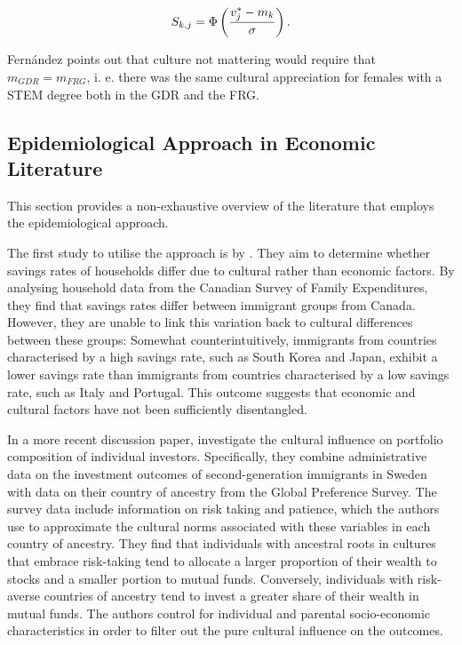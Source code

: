 \documentclass[a4paper, oneside, hyperfootnotes = false]{article}
\begin{document}
{\vspace{-8mm}

\begin{equation}
	\label{eq:sharecdfancestry}
	S_{k,j} = \Phi\left(\frac{v^{*}_{j} - m_{k}}{\sigma}\right)\textnormal{.}
\end{equation}

Fernández points out that culture not mattering would require that $m_{GDR} = m_{FRG}$, i. e. there was the same cultural appreciation for females with a STEM degree both in the GDR and the FRG.

\subsection{Epidemiological Approach in Economic Literature}
\label{epidliterature}

This section provides a non-exhaustive overview of the literature that employs the epidemiological approach.

The first study to utilise the approach is by \cite{Carroll1999}.
They aim to determine whether savings rates of households differ due to cultural rather than economic factors.
By analysing household data from the Canadian Survey of Family Expenditures, they find that savings rates differ between immigrant groups from Canada.
However, they are unable to link this variation back to cultural differences between these groups:
Somewhat counterintuitively, immigrants from countries characterised by a high savings rate, such as South Korea and Japan, exhibit a lower savings rate than immigrants from countries characterised by a low savings rate, such as Italy and Portugal.
This outcome suggests that economic and cultural factors have not been sufficiently disentangled.

In a more recent discussion paper, \cite{Ek2022} investigate the cultural influence on portfolio composition of individual investors.
Specifically, they combine administrative data on the investment outcomes of second-generation immigrants in Sweden with data on their country of ancestry from the Global Preference Survey.
The survey data include information on risk taking and patience, which the authors use to approximate the cultural norms associated with these variables in each country of ancestry.
They find that individuals with ancestral roots in cultures that embrace risk-taking tend to allocate a larger proportion of their wealth to stocks and a smaller portion to mutual funds.
Conversely, individuals with risk-averse countries of ancestry tend to invest a greater share of their wealth in mutual funds.
The authors control for individual and parental socio-economic characteristics in order to filter out the pure cultural influence on the outcomes.

}
\end{document}
